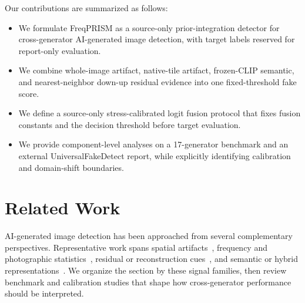 \documentclass[lettersize,journal]{IEEEtran}
\begin{document}
Our contributions are summarized as follows:
\begin{itemize}
    \item We formulate FreqPRISM as a source-only prior-integration detector for cross-generator AI-generated image detection, with target labels reserved for report-only evaluation.
    \item We combine whole-image artifact, native-tile artifact, frozen-CLIP semantic, and nearest-neighbor down-up residual evidence into one fixed-threshold fake score.
    \item We define a source-only stress-calibrated logit fusion protocol that fixes fusion constants and the decision threshold before target evaluation.
    \item We provide component-level analyses on a 17-generator benchmark and an external UniversalFakeDetect report, while explicitly identifying calibration and domain-shift boundaries.
\end{itemize}

\section{Related Work}
\label{sec:related_work}

AI-generated image detection has been approached from several complementary perspectives. Representative work spans spatial artifacts~\cite{wang2020cnnspot,liu2020gramnet,zhong2023patchcraft}, frequency and photographic statistics~\cite{frank2020frequency,liu2022realimages,zhong2025beyond}, residual or reconstruction cues~\cite{tan2023lgrad,tan2024npr,wang2023dire}, and semantic or hybrid representations~\cite{radford2021clip,ojha2023univfd,yan2025aide,cheng2025cospy}. We organize the section by these signal families, then review benchmark and calibration studies that shape how cross-generator performance should be interpreted.
\end{document}
